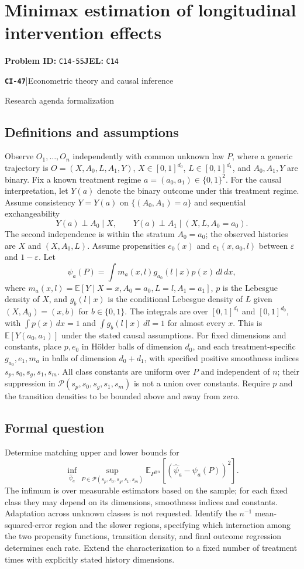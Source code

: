 \documentclass[11pt,a4paper]{article}
\newcommand{\E}{\mathbb E}
\newcommand{\entrymeta}[3]{{\sffamily\small\color{muted}\textbf{\texttt{#1}}\quad|\quad #2\par #3\par}}
\begin{document}
\section*{Minimax estimation of longitudinal intervention effects}
\textbf{Problem ID:} \texttt{C14-55}\quad \textbf{JEL:} \texttt{C14}\par
\label{problem:OP-0526}
\label{beyond:CI-47}
\entrymeta{CI-47}{Econometric theory and causal inference}{Research agenda formalization}
\subsection*{Definitions and assumptions}
Observe $O_1,\ldots,O_n$ independently with common unknown law $P$, where a generic trajectory is $O=(X,A_0,L,A_1,Y)$, $X\in[0,1]^{d_0}$, $L\in[0,1]^{d_1}$, and $A_0,A_1,Y$ are binary. Fix a known treatment regime $a=(a_0,a_1)\in\{0,1\}^2$. For the causal interpretation, let $Y(a)$ denote the binary outcome under this treatment regime. Assume consistency $Y=Y(a)$ on $\{(A_0,A_1)=a\}$ and sequential exchangeability
\[
 Y(a)\perp A_0\mid X,\qquad
 Y(a)\perp A_1\mid(X,L,A_0=a_0).
\]
The second independence is within the stratum $A_0=a_0$; the observed histories are $X$ and $(X,A_0,L)$. Assume propensities $e_0(x)$ and $e_1(x,a_0,l)$ between $\varepsilon$ and $1-\varepsilon$. Let
\[
 \psi_a(P)=\int m_a(x,l)g_{a_0}(l\mid x)p(x)\,dl\,dx,
\]
where $m_a(x,l)=\E[Y\mid X=x,A_0=a_0,L=l,A_1=a_1]$, $p$ is the Lebesgue density of $X$, and $g_b(l\mid x)$ is the conditional Lebesgue density of $L$ given $(X,A_0)=(x,b)$ for $b\in\{0,1\}$. The integrals are over $[0,1]^{d_1}$ and $[0,1]^{d_0}$, with $\int p(x)\,dx=1$ and $\int g_b(l\mid x)\,dl=1$ for almost every $x$. This is $\E[Y(a_0,a_1)]$ under the stated causal assumptions. For fixed dimensions and constants, place $p,e_0$ in Hölder balls of dimension $d_0$, and each treatment-specific $g_{a_0},e_1,m_a$ in balls of dimension $d_0+d_1$, with specified positive smoothness indices $s_p,s_0,s_g,s_1,s_m$. All class constants are uniform over $P$ and independent of $n$; their suppression in $\mathcal P(s_p,s_0,s_g,s_1,s_m)$ is not a union over constants. Require $p$ and the transition densities to be bounded above and away from zero.
\subsection*{Formal question}
Determine matching upper and lower bounds for
\[
 \inf_{\widehat\psi_a}\sup_{P\in\mathcal P(s_p,s_0,s_g,s_1,s_m)}
 \E_{P^{\otimes n}}[(\widehat\psi_a-\psi_a(P))^2].
\]
The infimum is over measurable estimators based on the sample; for each fixed class they may depend on its dimensions, smoothness indices and constants. Adaptation across unknown classes is not requested.
Identify the $n^{-1}$ mean-squared-error region and the slower regions, specifying which interaction among the two propensity functions, transition density, and final outcome regression determines each rate. Extend the characterization to a fixed number of treatment times with explicitly stated history dimensions.
\end{document}

